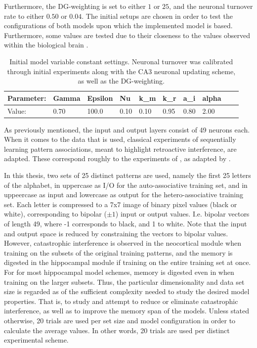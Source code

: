 Furthermore, the DG-weighting is set to either $1$ or $25$, and the neuronal turnover rate to either $0.50$ or $0.04$. The initial setups are chosen in order to test the configurations of both models upon which the implemented model is based. Furthermore, some values are tested due to their closeness to the values observed within the biological brain \citep{Rolls1998chpt6}.

\begin{table}
\centering
\caption{Initial model variable constant settings. Neuronal turnover was calibrated through initial experiments along with the CA3 neuronal updating scheme, as well as the DG-weighting.}
\label{table:initial_settings}
\begin{tabular}{|l|l|l|l|l|l|l|l|l|l|}
\cline{1-8}
Parameter: & Gamma & Epsilon & Nu   & k\_m & k\_r & a\_i & alpha \\ \hline
Value:     & 0.70  & 100.0   & 0.10 & 0.10 & 0.95 & 0.80 & 2.00 \\ \hline
\end{tabular}
\end{table}

As previously mentioned, the input and output layers consist of 49 neurons each. 
When it comes to the data that is used, classical experiments of sequentially learning pattern associations, meant to highlight retroactive interference, are adapted. These correspond roughly to the experiments of \citep{McCloskey1989}, as adapted by \citep{French1997, Hattori2010, Hattori2014}.

In this thesis, two sets of 25 distinct patterns are used, namely the first 25 letters of the alphabet, in uppercase as I/O for the auto-associative training set, and in uppeercase as input and lowercase as output for the hetero-associative training set. Each letter is compressed to a 7x7 image of binary pixel values (black or white), corresponding to bipolar ($\pm1$) input or output values. I.e. bipolar vectors of length 49, where -1 corresponds to black, and 1 to white. Note that the input and output space is reduced by constraining the vectors to bipolar values. However, catastrophic interference is observed in the neocortical module when training on the subsets of the original training patterns, and the memory is digested in the hippocampal module if training on the entire training set at once. For for most hippocampal model schemes, memory is digested even in when training on the larger subsets. Thus, the particular dimensionality and data set size is regarded as of the sufficient complexity needed to study the desired model properties. That is, to study and attempt to reduce or eliminate catastrophic interference, as well as to improve the memory span of the models.
Unless stated otherwise, 20 trials are used per set size and model configuration in order to calculate the average values. In other words, 20 trials are used per distinct experimental scheme.

